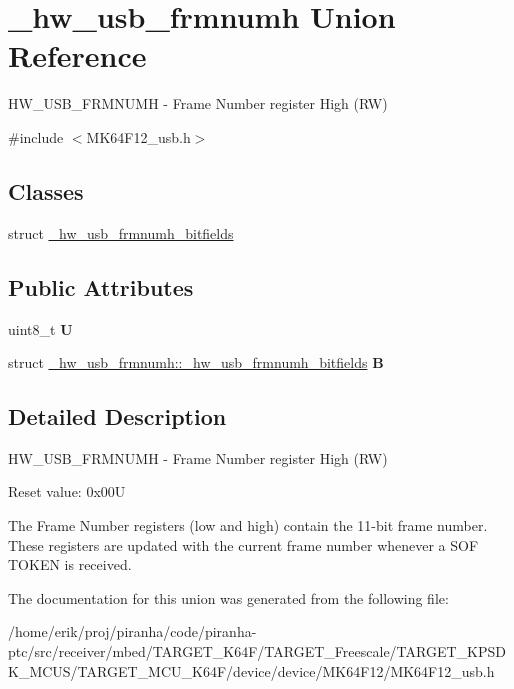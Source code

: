 \hypertarget{union__hw__usb__frmnumh}{}\section{\+\_\+hw\+\_\+usb\+\_\+frmnumh Union Reference}
\label{union__hw__usb__frmnumh}


H\+W\+\_\+\+U\+S\+B\+\_\+\+F\+R\+M\+N\+U\+MH -\/ Frame Number register High (RW)  




{\ttfamily \#include $<$M\+K64\+F12\+\_\+usb.\+h$>$}

\subsection*{Classes}
\begin{DoxyCompactItemize}
\item 
struct \hyperlink{struct__hw__usb__frmnumh_1_1__hw__usb__frmnumh__bitfields}{\+\_\+hw\+\_\+usb\+\_\+frmnumh\+\_\+bitfields}
\end{DoxyCompactItemize}
\subsection*{Public Attributes}
\begin{DoxyCompactItemize}
\item 
uint8\+\_\+t {\bfseries U}\hypertarget{union__hw__usb__frmnumh_a927af7cb66feff191c43dfc4e06c9418}{}\label{union__hw__usb__frmnumh_a927af7cb66feff191c43dfc4e06c9418}

\item 
struct \hyperlink{struct__hw__usb__frmnumh_1_1__hw__usb__frmnumh__bitfields}{\+\_\+hw\+\_\+usb\+\_\+frmnumh\+::\+\_\+hw\+\_\+usb\+\_\+frmnumh\+\_\+bitfields} {\bfseries B}\hypertarget{union__hw__usb__frmnumh_a6573d122481d5c63070195213d56fce1}{}\label{union__hw__usb__frmnumh_a6573d122481d5c63070195213d56fce1}

\end{DoxyCompactItemize}


\subsection{Detailed Description}
H\+W\+\_\+\+U\+S\+B\+\_\+\+F\+R\+M\+N\+U\+MH -\/ Frame Number register High (RW) 

Reset value\+: 0x00U

The Frame Number registers (low and high) contain the 11-\/bit frame number. These registers are updated with the current frame number whenever a S\+OF T\+O\+K\+EN is received. 

The documentation for this union was generated from the following file\+:\begin{DoxyCompactItemize}
\item 
/home/erik/proj/piranha/code/piranha-\/ptc/src/receiver/mbed/\+T\+A\+R\+G\+E\+T\+\_\+\+K64\+F/\+T\+A\+R\+G\+E\+T\+\_\+\+Freescale/\+T\+A\+R\+G\+E\+T\+\_\+\+K\+P\+S\+D\+K\+\_\+\+M\+C\+U\+S/\+T\+A\+R\+G\+E\+T\+\_\+\+M\+C\+U\+\_\+\+K64\+F/device/device/\+M\+K64\+F12/M\+K64\+F12\+\_\+usb.\+h\end{DoxyCompactItemize}
